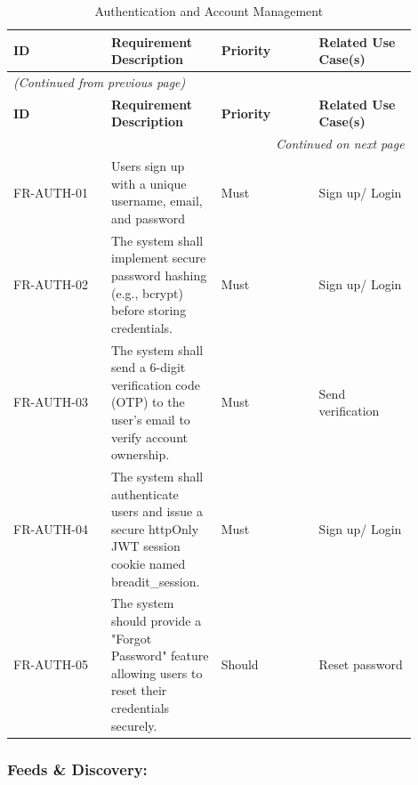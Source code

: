 \begin{longtable}{|p{0.225\linewidth}|p{0.225\linewidth}|p{0.225\linewidth}|p{0.225\linewidth}|}
\caption{Authentication and Account Management} \label{tab:5} \\
\hline
\textbf{ID} & \textbf{Requirement Description} & \textbf{Priority} & \textbf{Related Use Case(s)} \\
\hline
\endfirsthead
\multicolumn{4}{l}{\textit{(Continued from previous page)}} \\
\hline
\textbf{ID} & \textbf{Requirement Description} & \textbf{Priority} & \textbf{Related Use Case(s)} \\
\hline
\endhead
\hline \multicolumn{4}{r}{\textit{Continued on next page}} \\
\endfoot
\hline
\endlastfoot
FR-AUTH-01 & Users sign up with a unique username, email, and password & Must & Sign up/ Login \\
\hline
FR-AUTH-02 & The system shall implement secure password hashing (e.g., bcrypt) before storing credentials. & Must & Sign up/ Login \\
\hline
FR-AUTH-03 & The system shall send a 6-digit verification code (OTP) to the user's email to verify account ownership. & Must & Send verification \\
\hline
FR-AUTH-04 & The system shall authenticate users and issue a secure httpOnly JWT session cookie named breadit\_session. & Must & Sign up/ Login \\
\hline
FR-AUTH-05 & The system should provide a "Forgot Password" feature allowing users to reset their credentials securely. & Should & Reset password \\
\hline
\end{longtable}


\subsubsection{Feeds \& Discovery:}

